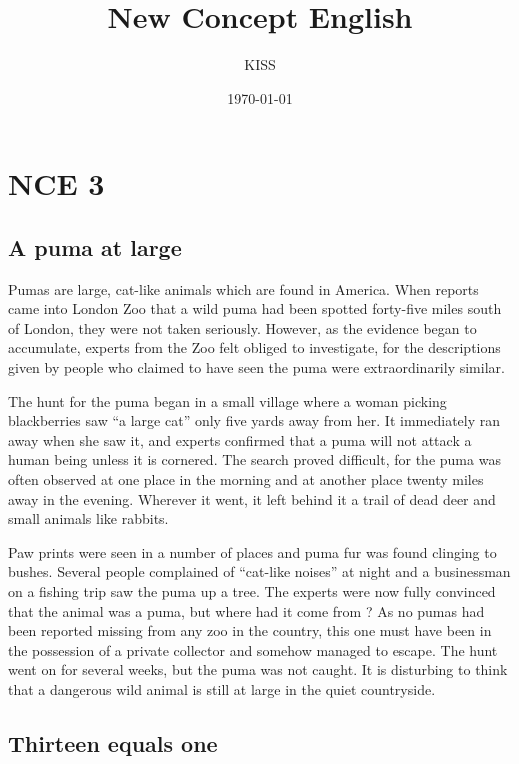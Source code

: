 \documentclass[11pt]{article}
\title{New Concept English}
\author{KISS}
\date{\today}
\begin{document}
\maketitle

\setcounter{tocdepth}{3}
\tableofcontents
\vspace*{1cm}


\section{NCE 3}
\label{sec-1}
\subsection{A puma at large}
\label{sec-1-1}

Pumas are large, cat-like animals which are found in America. When reports came into London Zoo that a wild puma had been spotted forty-five miles south of London, they were not taken seriously. However, as the evidence began to accumulate, experts from the Zoo felt obliged to investigate, for the descriptions given by people who claimed to have seen the puma were extraordinarily similar.

The hunt for the puma began in a small village where a woman picking blackberries saw ``a large cat'' only five yards away from her. It immediately ran away when she saw it, and experts confirmed that a puma will not attack a human being unless it is cornered. The search proved difficult, for the puma was often observed at one place in the morning and at another place twenty miles away in the evening. Wherever it went, it left behind it a trail of dead deer and small animals like rabbits.

Paw prints were seen in a number of places and puma fur was found clinging to bushes. Several people complained of ``cat-like noises'' at night and a businessman on a fishing trip saw the puma up a tree. The experts were now fully convinced that the animal was a puma, but where had it come from ? As no pumas had been reported missing from any zoo in the country, this one must have been in the possession of a private collector and somehow managed to escape. The hunt went on for several weeks, but the puma was not caught. It is disturbing to think that a dangerous wild animal is still at large in the quiet countryside.
\subsection{Thirteen equals one}
\label{sec-1-2}
\end{document}
